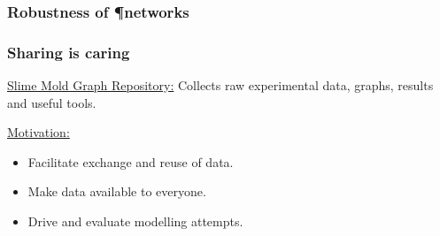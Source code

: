 \documentclass[	hyperref={pdfpagelabels=false}, xcolor=dvipsnames,
		11pt]{beamer}
\begin{document}
\begin{frame}
    \frametitle{Robustness of \P networks} 
   
	\begin{figure}[h]
		 \captionsetup[subfloat]{position=bottom,labelformat=empty,font=scriptsize}
	     \begin{center}
	     \end{center}
	\end{figure}
\end{frame}

\begin{frame}
    \frametitle{Sharing is caring} 

    \begin{block}{\underline{Slime Mold Graph Repository:}}
    	Collects  raw experimental data, graphs, results and useful tools.
    \end{block}

	\begin{alertblock}{\underline{Motivation:}}
	 \begin{itemize}
		   \item Facilitate exchange and reuse of data.
		   \item Make data available to everyone.
		   \item Drive and evaluate modelling attempts.
	 \end{itemize}
	\end{alertblock}
\end{frame}
\end{document}
